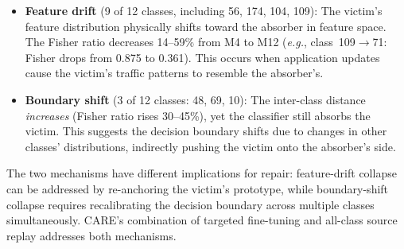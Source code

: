 \documentclass[journal]{IEEEtran}
\newcommand{\ours}{CARE}  %
\newcommand{\eg}{\textit{e.g.}}
\begin{document}
\begin{itemize}
  \item \textbf{Feature drift} (9 of 12 classes, including 56, 174, 104, 109): The victim's feature distribution physically shifts toward the absorber in feature space. The Fisher ratio decreases 14--59\% from M4 to M12 (\eg{}, class~109$\to$71: Fisher drops from 0.875 to 0.361). This occurs when application updates cause the victim's traffic patterns to resemble the absorber's.
  \item \textbf{Boundary shift} (3 of 12 classes: 48, 69, 10): The inter-class distance \emph{increases} (Fisher ratio rises 30--45\%), yet the classifier still absorbs the victim. This suggests the decision boundary shifts due to changes in other classes' distributions, indirectly pushing the victim onto the absorber's side.
\end{itemize}

The two mechanisms have different implications for repair: feature-drift collapse can be addressed by re-anchoring the victim's prototype, while boundary-shift collapse requires recalibrating the decision boundary across multiple classes simultaneously. \ours{}'s combination of targeted fine-tuning and all-class source replay addresses both mechanisms.
\end{document}
